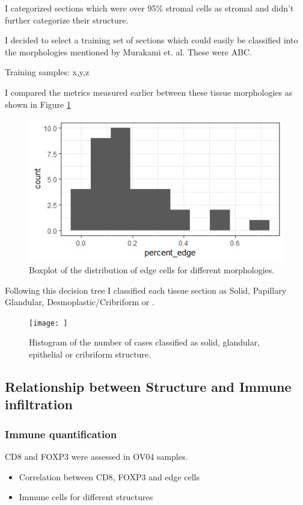 I categorized sections which were over 95\% stromal cells as stromal and didn't further categorize their structure. 

I decided to select a training set of sections which could easily be classified into the morphologies mentioned by Murakami et. al.  These were ABC. 

Training samples: x,y,z

I compared the metrics measured earlier between these tissue morphologies as shown in Figure \ref{fig:morph_edge}

\begin{figure}
    \centering
    \includegraphics{Chapter4/figs/percent_edge.png}
    \caption{Boxplot of the distribution of edge cells for different morphologies.}
    \label{fig:morph_edge}
\end{figure}


Following this decision tree I classified each tissue section as Solid, Papillary Glandular, Desmoplastic/Cribriform or . 

\begin{figure}
    \centering
    \texttt{[image: ]}
    \caption{Histogram of the number of cases classified as solid, glandular, epithelial  or cribriform structure.}
    \label{fig:num_classl}
\end{figure}


\subsection{Relationship between Structure and Immune infiltration}

\subsubsection{Immune quantification}

CD8 and FOXP3 were assessed in OV04 samples.
\begin{itemize}
    \item Correlation between CD8, FOXP3 and edge cells
    \item Immune cells for different structures
\end{itemize}

